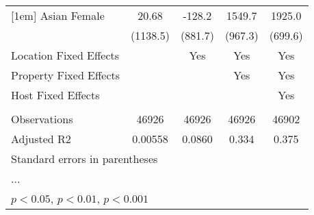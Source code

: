 \begin{table}[htbp]
\begin{tabular}{l*{4}{c}}
[1em]
Asian Female        &       20.68         &      -128.2         &      1549.7         &      1925.0\sym{**} \\
                    &    (1138.5)         &     (881.7)         &     (967.3)         &     (699.6)         \\
\hline
Location Fixed Effects&                     &         Yes         &         Yes         &         Yes         \\
Property Fixed Effects&                     &                     &         Yes         &         Yes         \\
Host Fixed Effects  &                     &                     &                     &         Yes         \\
\hline \vspace{-1.25em}&                     &                     &                     &                     \\
Observations        &       46926         &       46926         &       46926         &       46902         \\
Adjusted R2         &     0.00558         &      0.0860         &       0.334         &       0.375         \\
\hline\hline
\multicolumn{5}{l}{\footnotesize Standard errors in parentheses}\\
\multicolumn{5}{l}{\footnotesize ...}\\
\multicolumn{5}{l}{\footnotesize \sym{*} \(p<0.05\), \sym{**} \(p<0.01\), \sym{***} \(p<0.001\)}\\
\end{tabular}
\end{table}
